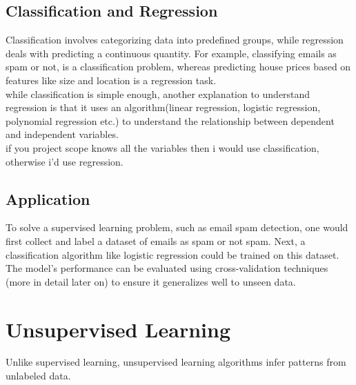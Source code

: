 \documentclass[11pt]{article}
\begin{document}
\subsection{Classification and Regression}
Classification involves categorizing data into predefined groups, while regression deals with predicting a continuous quantity. For example, classifying emails as spam or not, is a classification problem, whereas predicting house prices based on features like size and location is a regression task.\\
while classification is simple enough, another explanation to understand regression is that it uses an algorithm(linear regression, logistic regression, polynomial regression etc.) to understand the relationship between dependent and independent variables.\\
if you project scope knows all the variables then i would use classification, otherwise i'd use regression.

\subsection{Application}
To solve a supervised learning problem, such as email spam detection, one would first collect and label a dataset of emails as spam or not spam. Next, a classification algorithm like logistic regression could be trained on this dataset. The model's performance can be evaluated using cross-validation techniques (more in detail later on) to ensure it generalizes well to unseen data.

\section{Unsupervised Learning}
Unlike supervised learning, unsupervised learning algorithms infer patterns from unlabeled data.
\end{document}
